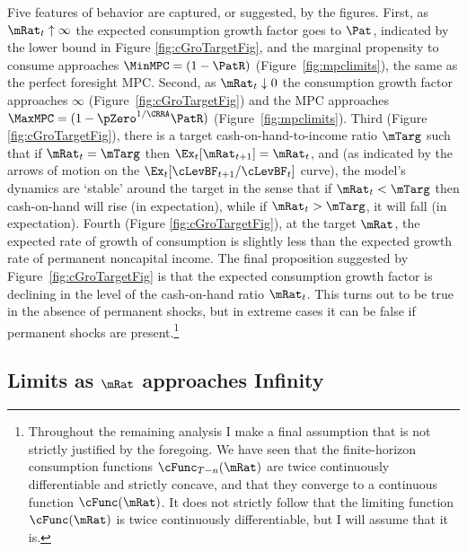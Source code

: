 \documentclass[BufferStockTheory]{subfiles}
\begin{document}
Five features of behavior are captured, or suggested, by the
figures. First, as $\mRat_{t} \uparrow \infty$ the expected
consumption growth factor goes to ${\Pat}$, indicated by the lower
bound in Figure \ref{fig:cGroTargetFig}, and the marginal propensity
to consume approaches $\MinMPC=(1-\PatR)$
(Figure~\ref{fig:mpclimits}), the same as the perfect foresight MPC.  Second, as $\mRat_t \downarrow 0$ the consumption
growth factor approaches $\infty$ (Figure~\ref{fig:cGroTargetFig}) and
the MPC approaches $\MaxMPC=(1-\pZero^{1/\CRRA}\PatR)$ (Figure~\ref{fig:mpclimits}).  Third (Figure
\ref{fig:cGroTargetFig}), there is a target cash-on-hand-to-income
ratio $\mTarg$ such that if $\mRat_t = \mTarg$ then $\Ex_t [
{\mRat}_{t+1}] = \mRat_t$, and (as indicated by the arrows of motion
on the $\Ex_{t}[\cLevBF_{t+1}/\cLevBF_{t}]$ curve), the model's dynamics
are `stable' around the target in the sense that if $\mRat_{t} <
\mTarg$ then cash-on-hand will rise (in expectation), while if
$\mRat_{t} > \mTarg$, it will fall (in expectation).  Fourth (Figure
\ref{fig:cGroTargetFig}), at the target $\mRat$, the expected rate of
growth of consumption is slightly less than the expected growth rate
of permanent noncapital income. The final proposition suggested by
Figure~\ref{fig:cGroTargetFig} is that the expected consumption growth
factor is declining in the level of the cash-on-hand ratio
$\mRat_{t}$.  This turns out to be true in the absence of permanent
shocks, but in extreme cases it can be false if permanent shocks are
present.\footnote{Throughout the remaining analysis I make a final
  assumption that is not strictly justified by the foregoing.  We have
  seen that the finite-horizon consumption functions
  $\cFunc_{T-n}(\mRat)$ are twice continuously differentiable and
  strictly concave, and that they converge to a continuous function
  $\cFunc(\mRat)$.  It does not strictly follow that the limiting
  function $\cFunc(\mRat)$ is twice continuously differentiable, but I
  will assume that it is.}

\renewcommand{\figFile}{cGroTargetFig}
\hypertarget{\figFile}{}


\hypertarget{LimitsAsmtToInfty}{}
\subsection{Limits as $\mRat$ approaches Infinity}

\label{subsec:LimitsAsmtToInfty}
\end{document}
